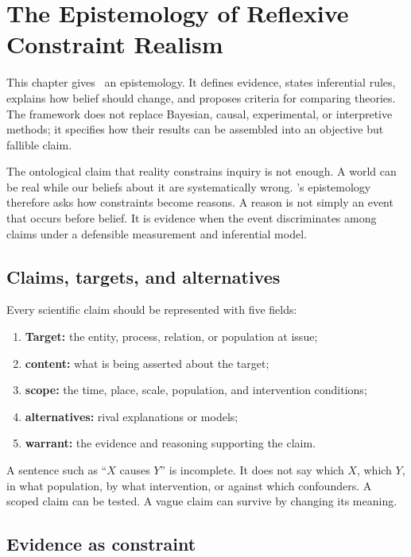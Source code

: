 \chapter{The Epistemology of Reflexive Constraint Realism}
\label{ch:epistemology}

\begin{chapterguide}
This chapter gives \RCR\ an epistemology. It defines evidence, states
inferential rules, explains how belief should change, and proposes criteria for
comparing theories. The framework does not replace Bayesian, causal,
experimental, or interpretive methods; it specifies how their results can be
assembled into an objective but fallible claim.
\end{chapterguide}

The ontological claim that reality constrains inquiry is not enough. A world can
be real while our beliefs about it are systematically wrong. \RCR's
epistemology therefore asks how constraints become reasons. A reason is not
simply an event that occurs before belief. It is evidence when the event
discriminates among claims under a defensible measurement and inferential
model.

\section{Claims, targets, and alternatives}

Every scientific claim should be represented with five fields:

\begin{enumerate}
\item \textbf{Target:} the entity, process, relation, or population at issue;
\item \textbf{content:} what is being asserted about the target;
\item \textbf{scope:} the time, place, scale, population, and intervention
conditions;
\item \textbf{alternatives:} rival explanations or models;
\item \textbf{warrant:} the evidence and reasoning supporting the claim.
\end{enumerate}

A sentence such as \enquote{\(X\) causes \(Y\)} is incomplete. It does not say
which \(X\), which \(Y\), in what population, by what intervention, or against
which confounders. A scoped claim can be tested. A vague claim can survive by
changing its meaning.

\section{Evidence as constraint}

